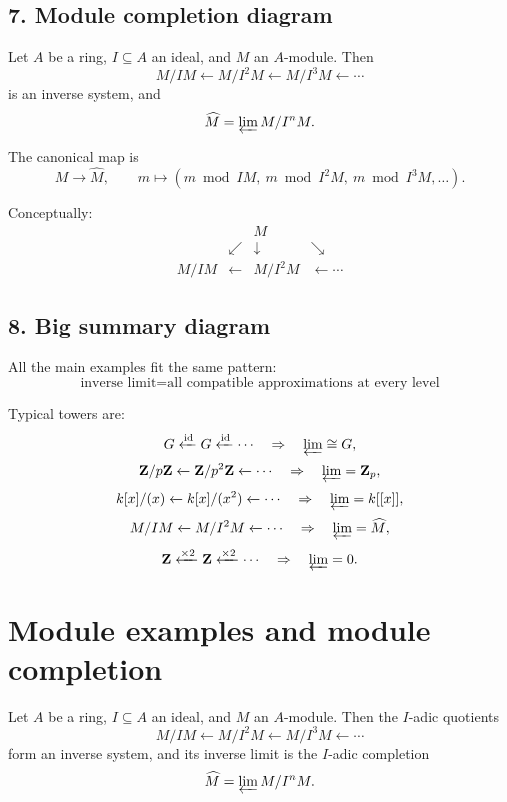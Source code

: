\documentclass[12pt,a4paper]{article}
\theoremstyle{plain}
\theoremstyle{definition}      %
\begin{document}
	\subsection*{7. Module completion diagram}
	
	Let \(A\) be a ring, \(I\subseteq A\) an ideal, and \(M\) an \(A\)-module. Then
	\[
	M/IM \xleftarrow{} M/I^2M \xleftarrow{} M/I^3M \xleftarrow{}\cdots
	\]
	is an inverse system, and
	\[
	\widehat M=\varprojlim M/I^nM.
	\]
	
	The canonical map is
	\[
	M \to \widehat M,
	\qquad
	m\mapsto (m \bmod IM,\ m \bmod I^2M,\ m \bmod I^3M,\dots).
	\]
	
	Conceptually:
	\[
	\begin{array}{cccccc}
		& & M \\
		& \swarrow & \downarrow & \searrow \\
		M/IM & \leftarrow & M/I^2M & \leftarrow \cdots
	\end{array}
	\]
	
	\subsection*{8. Big summary diagram}
	
	All the main examples fit the same pattern:
	\[
	\boxed{
		\text{inverse limit}=
		\text{all compatible approximations at every level}
	}
	\]
	
	Typical towers are:
	\[
	G \xleftarrow{\mathrm{id}} G \xleftarrow{\mathrm{id}} \cdots
	\quad\Rightarrow\quad
	\varprojlim \cong G,
	\]
	\[
	\mathbf Z/p\mathbf Z \xleftarrow{} \mathbf Z/p^2\mathbf Z \xleftarrow{} \cdots
	\quad\Rightarrow\quad
	\varprojlim=\mathbf Z_p,
	\]
	\[
	k[x]/(x) \xleftarrow{} k[x]/(x^2) \xleftarrow{} \cdots
	\quad\Rightarrow\quad
	\varprojlim=k[[x]],
	\]
	\[
	M/IM \xleftarrow{} M/I^2M \xleftarrow{} \cdots
	\quad\Rightarrow\quad
	\varprojlim=\widehat M,
	\]
	\[
	\mathbf Z \xleftarrow{\times2} \mathbf Z \xleftarrow{\times2} \cdots
	\quad\Rightarrow\quad
	\varprojlim=0.
	\]
	
	
	\section*{Module examples and module completion}
	
	Let \(A\) be a ring, \(I\subseteq A\) an ideal, and \(M\) an \(A\)-module. Then the \(I\)-adic quotients
	\[
	M/IM \xleftarrow{} M/I^2M \xleftarrow{} M/I^3M \xleftarrow{}\cdots
	\]
	form an inverse system, and its inverse limit is the \(I\)-adic completion
	\[
	\widehat M=\varprojlim M/I^nM.
	\]
	
\end{document}
